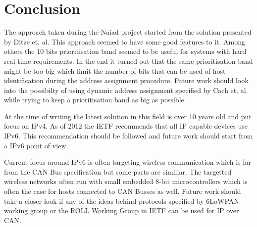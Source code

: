 \section{Conclusion}\label{sec:conclusion}
The approach taken during the Naiad project started from the solution presented
by Ditze et. al. This approach seemed to have some good features to it. Among
others the 10 bits prioritisation band seemed to be useful for systems with
hard real-time requirements. In the end it turned out that the same
prioritisation band might be too big which limit the number of bits that can be
used of host identification during the address assignment procedure. Future
work should look into the possibilty of using dynamic address assignment
specified by Cach et. al. while trying to keep a prioritisation band as big as
possible.

At the time of writing the latest solution in this field is over 10 years old
and put focus on IPv4. As of 2012 the IETF recommends that all IP capable
devices use IPv6. This recommendation should be followed and future work should
start from a IPv6 point of view.

Current focus around IPv6 is often targeting wireless communication which is
far from the CAN Bus specification but some parts are similiar. The targetted
wireless networks often run with small embedded 8-bit microcontrollers which is
often the case for hosts connected to CAN Busses as well. Future work should
take a closer look if any of the ideas behind protocols specified by 6LoWPAN
working group or the ROLL Working Group in IETF can be used for IP over CAN.


